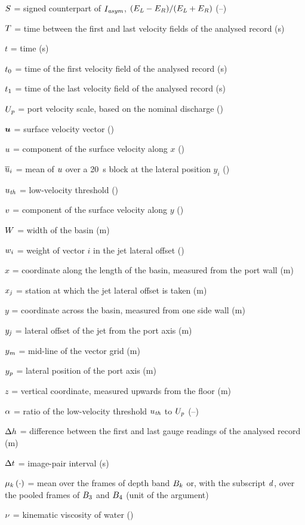 $S$ = signed counterpart of $I_{\mathit{asym}}$, $(E_{\mathit{L}} - E_{\mathit{R}})/(E_{\mathit{L}} + E_{\mathit{R}})$ (--)

$T$ = time between the first and last velocity fields of the analysed record (s)

$t$ = time (s)

$t_{0}$ = time of the first velocity field of the analysed record (s)

$t_{1}$ = time of the last velocity field of the analysed record (s)

$U_{\mathit{p}}$ = port velocity scale, based on the nominal discharge (\mps)

$\boldsymbol{u}$ = surface velocity vector (\mps)

$u$ = component of the surface velocity along $x$ (\mps)

$\overline{u}_{i}$ = mean of $u$ over a 20~s block at the lateral position $y_{i}$ (\mps)

$u_{\mathit{th}}$ = low-velocity threshold (\mps)

$v$ = component of the surface velocity along $y$ (\mps)

$W$ = width of the basin (m)

$w_{i}$ = weight of vector $i$ in the jet lateral offset (\sqmpss)

$x$ = coordinate along the length of the basin, measured from the port wall (m)

$x_{\mathit{j}}$ = station at which the jet lateral offset is taken (m)

$y$ = coordinate across the basin, measured from one side wall (m)

$y_{\mathit{j}}$ = lateral offset of the jet from the port axis (m)

$y_{\mathit{m}}$ = mid-line of the vector grid (m)

$y_{\mathit{p}}$ = lateral position of the port axis (m)

$z$ = vertical coordinate, measured upwards from the floor (m)

$\alpha$ = ratio of the low-velocity threshold $u_{\mathit{th}}$ to $U_{\mathit{p}}$ (--)

$\Delta h$ = difference between the first and last gauge readings of the analysed record (m)

$\Delta t$ = image-pair interval (s)

$\mu_{k}\left(\cdot\right)$ = mean over the frames of depth band $B_{k}$ or, with the subscript $\mathit{d}$, over the pooled frames of $B_{3}$ and $B_{4}$ (unit of the argument)

$\nu$ = kinematic viscosity of water (\sqmps)

